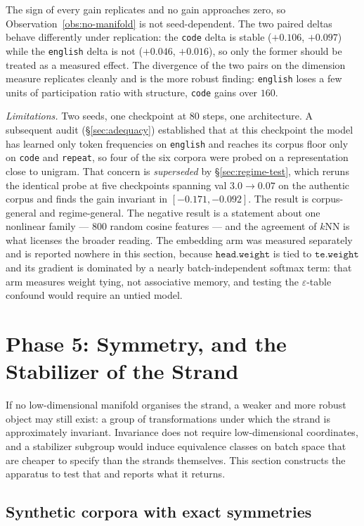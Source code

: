 The sign of every gain replicates and no gain approaches zero, so
Observation~\ref{obs:no-manifold} is not seed-dependent. The two paired deltas
behave differently under replication: the \texttt{code} delta is stable
($+0.106$, $+0.097$) while the \texttt{english} delta is not ($+0.046$,
$+0.016$), so only the former should be treated as a measured effect. The
divergence of the two pairs on the dimension measure replicates cleanly and is
the more robust finding: \texttt{english} loses a few units of participation
ratio with structure, \texttt{code} gains over $160$.

\emph{Limitations.} Two seeds, one checkpoint at $80$ steps, one architecture.
A subsequent audit (\S\ref{sec:adequacy}) established that at this checkpoint the
model has learned only token frequencies on \texttt{english} and reaches its
corpus floor only on \texttt{code} and \texttt{repeat}, so four of the six
corpora were probed on a representation close to unigram. That concern is
\emph{superseded} by \S\ref{sec:regime-test}, which reruns the identical
probe at five checkpoints spanning val $3.0\to0.07$ on the authentic corpus
and finds the gain invariant in $[-0.171,-0.092]$. The result is
corpus-general and regime-general. The negative result is a statement
about one nonlinear family --- $800$ random cosine features --- and the
agreement of $k$NN is what licenses the broader reading. The embedding arm was
measured separately and is reported nowhere in this section, because
$\texttt{head.weight}$ is tied to $\texttt{te.weight}$ and its gradient is
dominated by a nearly batch-independent softmax term: that arm measures weight
tying, not associative memory, and testing the $\varepsilon$-table confound
would require an untied model.

\section{Phase 5: Symmetry, and the Stabilizer of the Strand}
\label{sec:symmetry}

If no low-dimensional manifold organises the strand, a weaker and more robust
object may still exist: a group of transformations under which the strand is
approximately invariant. Invariance does not require low-dimensional
coordinates, and a stabilizer subgroup would induce equivalence classes on
batch space that are cheaper to specify than the strands themselves. This
section constructs the apparatus to test that and reports what it returns.

\subsection{Synthetic corpora with exact symmetries}
\label{sec:synth}

